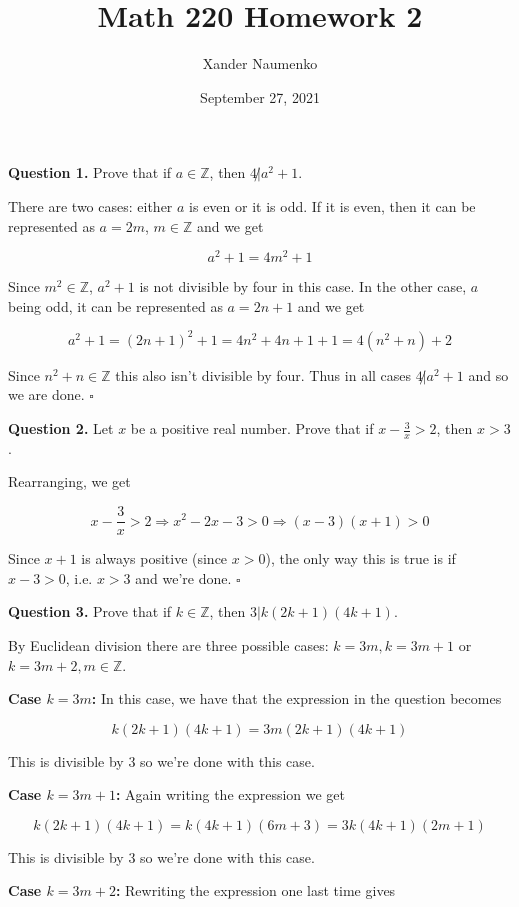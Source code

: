 \documentclass[letterpaper, reqno,11pt]{article}
\newcommand{\ZZ}{\mathbb{Z}}
\begin{document}
\title{Math 220 Homework 2}
\date{September 27, 2021}
\author{Xander Naumenko}
\maketitle

{\noindent\bf Question 1.} Prove that if $a\in\ZZ$, then $4\not| a^2+1$. 

\medskip

There are two cases: either $a$ is even or it is odd. If it is even, then it can be represented as $a=2m$, $m\in\ZZ$ and we get 

$$
    a^2+1=4m^2+1
$$

Since $m^2\in\ZZ$, $a^2+1$ is not divisible by four in this case. In the other case, $a$ being odd, it can be represented as $a=2n+1$ and we get 

$$
    a^2+1=(2n+1)^2+1=4n^2+4n+1+1=4(n^2+n)+2
$$

Since $n^2+n\in\ZZ$ this also isn't divisible by four. Thus in all cases $4\not|a^2+1$ and so we are done. $\square$

{\noindent\bf Question 2.} Let $x$ be a positive real number. Prove that if $x-\frac3x>2$, then $x>3$. 

\medskip

Rearranging, we get 

$$
    x-\frac3x>2\Rightarrow x^2-2x-3>0\Rightarrow (x-3)(x+1)>0
$$

Since $x+1$ is always positive (since $x>0$), the only way this is true is if $x-3>0$, i.e. $x>3$ and we're done. $\square$

{\noindent\bf Question 3.} Prove that if $k\in\ZZ$, then $3|k(2k+1)(4k+1)$. 

\medskip

By Euclidean division there are three possible cases: $k=3m, k=3m+1$ or $k=3m+2, m\in\ZZ$. 

{\bf Case $k=3m$:} In this case, we have that the expression in the question becomes

$$
    k(2k+1)(4k+1)=3m(2k+1)(4k+1)
$$

This is divisible by 3 so we're done with this case. 

{\bf Case $k=3m+1$:} Again writing the expression we get 

$$
    k(2k+1)(4k+1)=k(4k+1)(6m+3)=3k(4k+1)(2m+1)
$$

This is divisible by 3 so we're done with this case. 

{\bf Case $k=3m+2$:} Rewriting the expression one last time gives 
\end{document}
